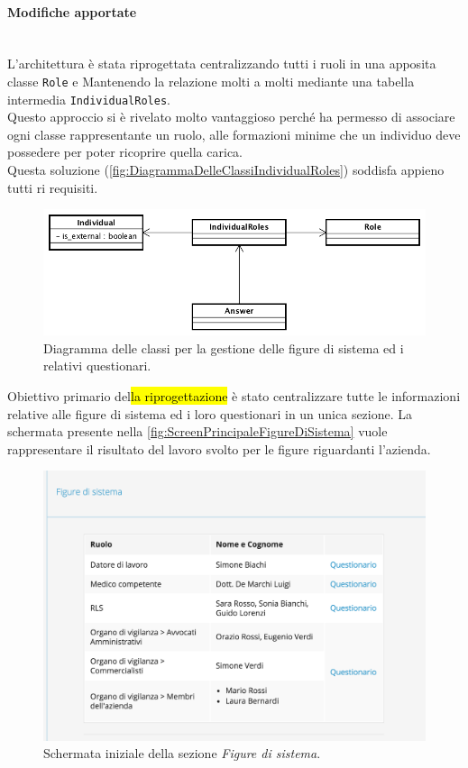 	\paragraph*{Modifiche apportate}\mbox{} \\
	L'architettura è stata riprogettata centralizzando tutti i ruoli in una apposita classe \texttt{Role} e Mantenendo la relazione molti a molti mediante una tabella intermedia \texttt{IndividualRoles}. \\
	Questo approccio si è rivelato molto vantaggioso perché ha permesso di associare ogni classe rappresentante un ruolo, alle formazioni minime che un individuo deve possedere per poter ricoprire quella carica. \\
	Questa soluzione (\autoref{fig:DiagrammaDelleClassiIndividualRoles}) soddisfa appieno tutti ri requisiti.\\
		\begin{figure}[H]
			\begin{center}
				\includegraphics[width=12cm]{Pics/UMLClassiFigureDiSistema.png}
				\caption{
					Diagramma delle classi per la gestione delle figure di sistema ed i relativi questionari.}
				\label{fig:DiagrammaDelleClassiIndividualRoles}
			\end{center}
		\end{figure}
	Obiettivo primario del\hl{la riprogettazione} è stato centralizzare tutte le informazioni relative alle figure di sistema ed i loro questionari in un unica sezione. 
	La schermata presente nella  \autoref{fig:ScreenPrincipaleFigureDiSistema} vuole rappresentare il risultato del lavoro svolto per le figure riguardanti l'azienda. \\
		\begin{figure}[H]
			\begin{center}
				\includegraphics[width=12cm]{Pics/ScreenFigureDiSistemaProspetto.png}
				\caption{
					Schermata iniziale della sezione \textit{Figure di sistema}.}
				\label{fig:ScreenPrincipaleFigureDiSistema}
			\end{center}
		\end{figure}
